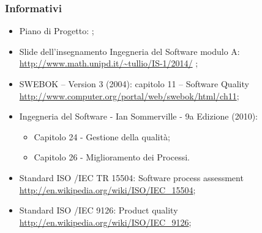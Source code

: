 \subsubsection{Informativi}
\begin{itemize}
\item Piano di Progetto: \href{run:../../Esterni/\fPianoDiProgetto}{\fEscapePianoDiProgetto};
\item Slide dell’insegnamento Ingegneria del Software modulo A:\\
\url{http://www.math.unipd.it/~tullio/IS-1/2014/} ;
\item SWEBOK – Version 3 (2004): capitolo 11 – Software Quality\\
\url{http://www.computer.org/portal/web/swebok/html/ch11};
\item Ingegneria del Software - Ian Sommerville - 9a Edizione (2010):
\begin{itemize}
	\item Capitolo 24 - Gestione della qualità;
	\item Capitolo 26 - Miglioramento dei Processi.
\end{itemize}
\item Standard ISO /IEC TR 15504: Software process assessment\\ \url{http://en.wikipedia.org/wiki/ISO/IEC_15504};
\item Standard ISO /IEC 9126: Product quality\\ \url{http://en.wikipedia.org/wiki/ISO/IEC_9126};
\end{itemize}

